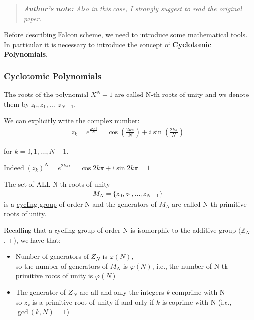 \begin{quotation}
    \textit{\textbf{Author's note:} Also in this case, I strongly suggest to read the original paper.}
\end{quotation}

\noindent
Before describing Falcon scheme, we need to introduce some mathematical tools.\\
In particular it is necessary to introduce the concept of \textbf{Cyclotomic Polynomials}.

\subsubsection {Cyclotomic Polynomials}
The roots of the polynomial $X^N - 1$ are called N-th roots of unity and we denote them by $z_0, z_1, \ldots, z_{N-1}$.
\medskip

\noindent
We can explicitly write the complex number:
\begin{align*}
    z_k = e^{\frac{2 k\pi i}{N}} = \cos\left(\frac{2 k\pi}{N}\right) + i \sin\left(\frac{2 k\pi}{N}\right)
\end{align*}

\noindent
for $k = 0, 1, \ldots, N-1$.
\medskip

\noindent
Indeed $(z_k)^N = e^{2 k\pi i} = \cos 2k\pi + i \sin 2k\pi = 1$
\bigskip

\noindent
The set of ALL N-th roots of unity
\begin{align*}
    M_N = \{z_0, z_1, \ldots, z_{N-1}\}
\end{align*}
\noindent
is a \underline{cycling group} of order N and the generators of $M_N$ are called N-th primitive roots of unity.\\
\vspace{1 cm}

\noindent
Recalling that a cycling group of order N is isomorphic to the additive group $(\mathbb{Z}_N$, +), we have that:
\begin{itemize}
    \item Number of generators of $Z_N$ is $\varphi(N)$,\\ 
    so the number of generators of $M_N$ is $\varphi(N)$, i.e., the number of N-th primitive roots of unity is $\varphi(N)$
    \item The generator of $Z_N$  are all and only the integers $k$ comprime with N\\
    so  $z_k$ is a primitive root of unity if and only if $k$ is coprime with N (i.e., $\gcd(k, N) = 1$)
\end{itemize} 

